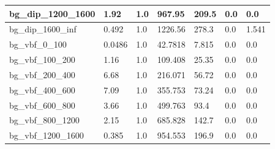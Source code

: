 \documentclass[a4paper, 10pt]{article}
\begin{document}
\begin{table}[H]
\begin{center}
\begin{tabular}{|m{23.0mm}|m{23.0mm}|m{18.0mm}|m{19.0mm}|m{19.0mm}|m{19.0mm}|m{19.0mm}|}
      \hline
      {\cellcolor{white}         bg\_dip\_1200\_1600}& {\cellcolor{white}         1.92}& {\cellcolor{white}         1.0}& {\cellcolor{white}         967.95}& {\cellcolor{white}         209.5}& {\cellcolor{green}         0.0}& {\cellcolor{green}         0.0}\\
      \hline
      {\cellcolor{white}         bg\_dip\_1600\_inf}& {\cellcolor{white}         0.492}& {\cellcolor{white}         1.0}& {\cellcolor{white}         1226.56}& {\cellcolor{white}         278.3}& {\cellcolor{green}         0.0}& {\cellcolor{green}         1.541}\\
      \hline
      {\cellcolor{white}         bg\_vbf\_0\_100}& {\cellcolor{white}         0.0486}& {\cellcolor{white}         1.0}& {\cellcolor{white}         42.7818}& {\cellcolor{white}         7.815}& {\cellcolor{green}         0.0}& {\cellcolor{green}         0.0}\\
      \hline
      {\cellcolor{white}         bg\_vbf\_100\_200}& {\cellcolor{white}         1.16}& {\cellcolor{white}         1.0}& {\cellcolor{white}         109.408}& {\cellcolor{white}         25.35}& {\cellcolor{green}         0.0}& {\cellcolor{green}         0.0}\\
      \hline
      {\cellcolor{white}         bg\_vbf\_200\_400}& {\cellcolor{white}         6.68}& {\cellcolor{white}         1.0}& {\cellcolor{white}         216.071}& {\cellcolor{white}         56.72}& {\cellcolor{green}         0.0}& {\cellcolor{green}         0.0}\\
      \hline
      {\cellcolor{white}         bg\_vbf\_400\_600}& {\cellcolor{white}         7.09}& {\cellcolor{white}         1.0}& {\cellcolor{white}         355.753}& {\cellcolor{white}         73.24}& {\cellcolor{green}         0.0}& {\cellcolor{green}         0.0}\\
      \hline
      {\cellcolor{white}         bg\_vbf\_600\_800}& {\cellcolor{white}         3.66}& {\cellcolor{white}         1.0}& {\cellcolor{white}         499.763}& {\cellcolor{white}         93.4}& {\cellcolor{green}         0.0}& {\cellcolor{green}         0.0}\\
      \hline
      {\cellcolor{white}         bg\_vbf\_800\_1200}& {\cellcolor{white}         2.15}& {\cellcolor{white}         1.0}& {\cellcolor{white}         685.828}& {\cellcolor{white}         142.7}& {\cellcolor{green}         0.0}& {\cellcolor{green}         0.0}\\
      \hline
      {\cellcolor{white}         bg\_vbf\_1200\_1600}& {\cellcolor{white}         0.385}& {\cellcolor{white}         1.0}& {\cellcolor{white}         954.553}& {\cellcolor{white}         196.9}& {\cellcolor{green}         0.0}& {\cellcolor{green}         0.0}\\

\end{tabular}
\end{center}
\end{table}
\end{document}
